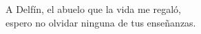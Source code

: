 \begin{dedication}
    A Delfín, el abuelo que la vida me regaló, \\  
    espero no olvidar ninguna 
    de tus enseñanzas.
\end{dedication}